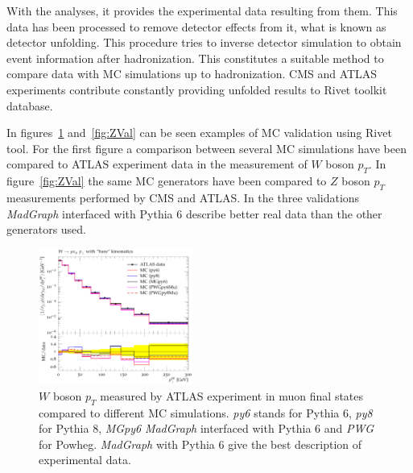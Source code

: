 With the analyses, it provides the experimental data resulting from them. This data has been processed to remove detector effects from it, what is known as detector unfolding. This procedure tries to inverse detector simulation to obtain event information after hadronization. This constitutes a suitable method to compare data with MC simulations up to hadronization. CMS and ATLAS experiments contribute constantly providing unfolded results to Rivet toolkit database.

In figures~\ref{fig:WVal} and~\ref{fig:ZVal} can be seen examples of MC validation using Rivet tool. For the first figure a comparison between several MC simulations have been compared to ATLAS experiment data in the measurement of $W$ boson $p_{T}$. In figure~\ref{fig:ZVal} the same MC generators have been compared to $Z$ boson $p_{T}$ measurements performed by CMS and ATLAS. In the three validations \textit{MadGraph} interfaced with Pythia 6 describe better real data than the other generators used. 

\begin{figure}[!Hhtbp]
  \begin{center}
    \includegraphics[width=0.45\textwidth]{figs/Wpt_rivet.png}
    \caption{$W$ boson $p_{T}$ measured by ATLAS experiment in muon final states compared to different MC simulations. \textit{py6} stands for Pythia 6, \textit{py8} for Pythia 8, \textit{MGpy6} \textit{MadGraph} interfaced with Pythia 6 and \textit{PWG} for Powheg. \textit{MadGraph} with Pythia 6 give the best description of experimental data.}
    \label{fig:WVal}
  \end{center}
\end{figure}

